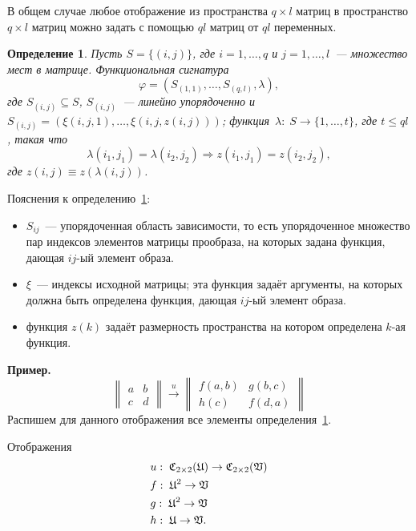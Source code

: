 \documentclass[a4paper, 12pt]{report}
\newtheorem{definition}{Определение}[chapter]
\begin{document}
В общем случае любое отображение из пространства $q\times l$ матриц в пространство $q\times l$ матриц можно задать с помощью $ql$ матриц от $ql$ переменных.

\begin{definition}
\label{def::sign}
Пусть $S = \{ (i, j) \}$, где $i = 1,\ldots, q$ и $j = 1,\ldots, l$~--- множество мест в матрице. Функциональная сигнатура 
\[
\varphi = (S_{(1,1)}, \ldots, S_{(q, l)}, \lambda),
\]
где $S_{(i, j)} \subseteq S$, $S_{(i,j)}$~--- линейно упорядоченно и $S_{(i,j)} = (\xi(i, j, 1), \ldots, \xi(i, j, z(i, j)))$; функция~$\lambda: \;S \rightarrow \{1, \ldots, t\}$, где $t \leq ql$, такая что
\[
\lambda(i_1, j_1) = \lambda(i_2, j_2) \Rightarrow z(i_1, j_1) = z(i_2, j_2),
\]
где $z(i, j) \equiv z(\lambda(i, j))$.
\end{definition}
Пояснения к определению~\ref{def::sign}:
\begin{itemize}
\item $S_{ij}$~--- упорядоченная область зависимости, то есть упорядоченное множество пар индексов элементов матрицы прообраза, на которых задана функция, дающая $ij$-ый элемент образа.
\item $\xi$~--- индексы исходной матрицы; эта функция задаёт аргументы, на которых должна быть определена функция, дающая $ij$-ый элемент образа.
\item функция $z(k)$ задаёт размерность пространства на котором определена $k$-ая функция.
\end{itemize}
\textbf{Пример.}
\[
\begin{Vmatrix}
a & b\\
c & d
\end{Vmatrix}
\mathop{\longrightarrow}\limits^u
\begin{Vmatrix}
f(a, b) & g(b, c)\\
h(c) & f(d, a)
\end{Vmatrix}
\]
Распишем для данного отображения все элементы определения~\ref{def::sign}.

Отображения
\begin{equation*}
\begin{split}
& u:\; \mathfrak{C}_{2 \times 2}(\mathfrak{U}) \rightarrow \mathfrak{C}_{2 \times 2}(\mathfrak{V}) \\
& f: \; \mathfrak{U}^2 \rightarrow \mathfrak{V} \\
& g: \; \mathfrak{U}^2 \rightarrow \mathfrak{V} \\
& h: \; \mathfrak{U} \rightarrow \mathfrak{V}.
\end{split}
\end{equation*}
\end{document}
